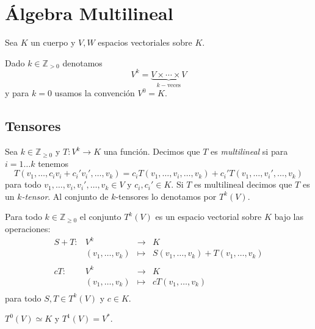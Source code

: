 \chapter{\'Algebra Multilineal}

Sea $K$ un cuerpo y $V, W$ espacios vectoriales sobre $K$.

\begin{nota}
Dado $k\in\mathbb{Z}_{> 0}$ denotamos
$$V^k=\underbrace{V\times\cdots\times V}_{k-\text{veces}}$$
y para $k=0$ usamos la convenci\'on $V^0=K$.
\end{nota}

\section{Tensores}

\begin{defn}
Sea $k\in\mathbb{Z}_{\ge 0}$ y $T:V^k\longrightarrow K$ una funci\'on. Decimos que $T$ es \emph{multilineal} si para $i=1\ldots k$ tenemos
$$ T(v_1,\ldots,c_iv_i+c_i'v_i',\ldots,v_k)=c_iT(v_1,\ldots,v_i,\ldots,v_k)+c_i'T(v_1,\ldots,v_i',\ldots,v_k)$$
para todo $v_1,\ldots,v_i,v_i',\ldots,v_k\in V$ y $c_i,c_i'\in K$. Si $T$ es multilineal decimos que $T$ es un \emph{$k$-tensor}. Al conjunto de $k$-tensores lo denotamos por $T^k(V)$.
\end{defn}

\begin{obs}
Para todo $k\in\mathbb{Z}_{\ge 0}$ el conjunto $T^k(V)$ es un espacio vectorial sobre $K$ bajo las operaciones:
$$
\begin{array}{rccl}
S+T:& V^k &\longrightarrow & K\\
&(v_1,\ldots,v_k) & \longmapsto & S(v_1,\ldots,v_k)+T(v_1,\ldots,v_k)\\
\\
cT:& V^k &\longrightarrow & K\\
&(v_1,\ldots,v_k) & \longmapsto & cT(v_1,\ldots,v_k)\\
\end{array}
$$
para todo $S,T\in T^k(V)$ y $c\in K$.
\end{obs}

\begin{obs}
$T^0(V)\simeq K$ y $T^1(V)=V^*$.
\end{obs}

